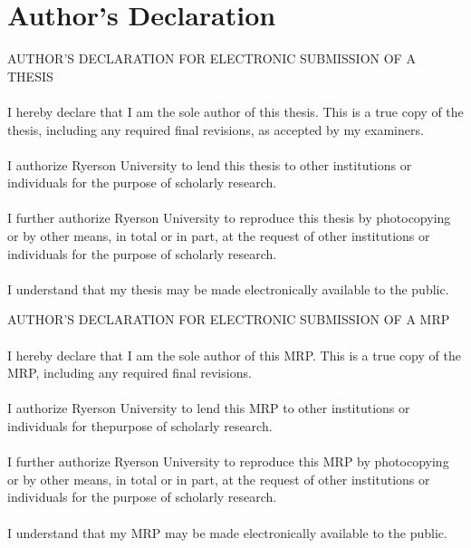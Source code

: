 

\chapter*{Author's Declaration} \label{authors-declaration}

{%
\noindent
AUTHOR'S DECLARATION FOR ELECTRONIC SUBMISSION OF A THESIS \\ ~ \\
\noindent
I hereby declare that I am the sole author of this thesis. This is a true copy of the thesis, including any required final revisions, as accepted by my examiners.\\ ~ \\
\noindent
I authorize Ryerson University to lend this thesis to other institutions or individuals for the purpose of scholarly research. \\ ~ \\
\noindent
I further authorize Ryerson University to reproduce this thesis by photocopying or by other means, in total or in part, at the request of other institutions or individuals for the purpose of scholarly research. \\ ~ \\
\noindent
I understand that my thesis may be made electronically available to the public.

{%
\noindent
AUTHOR'S DECLARATION FOR ELECTRONIC SUBMISSION OF A MRP \\ ~ \\
\noindent
I hereby declare that I am the sole author of this MRP. This is a true copy of the MRP, including any required final revisions. \\ ~ \\
\noindent
I authorize Ryerson University to lend this MRP to other institutions or individuals for thepurpose of scholarly research. \\ ~ \\
\noindent
I further authorize Ryerson University to reproduce this MRP by photocopying or by other means, in total or in part, at the request of other institutions or individuals for the purpose of scholarly research. \\ ~ \\
\noindent
I understand that my MRP may be made electronically available to the public.

}}
